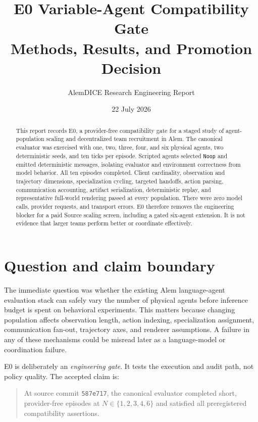 \documentclass[11pt]{article}
\title{E0 Variable-Agent Compatibility Gate\\
\large Methods, Results, and Promotion Decision}
\author{AlemDICE Research Engineering Report}
\date{22 July 2026}
\newcommand{\code}[1]{\texttt{#1}}
\begin{document}
\maketitle

\begin{abstract}
This report records E0, a provider-free compatibility gate for a staged study of
agent-population scaling and decentralized team recruitment in Alem.  The
canonical evaluator was exercised with one, two, three, four, and six physical
agents, two deterministic seeds, and ten ticks per episode.  Scripted agents
selected \code{Noop} and emitted deterministic messages, isolating evaluator and
environment correctness from model behavior.  All ten episodes completed.
Client cardinality, observation and trajectory dimensions, specialization
cycling, targeted handoffs, action parsing, communication accounting, artifact
serialization, deterministic replay, and representative full-world rendering
passed at every population.  There were zero model calls, provider requests, and
transport errors.  E0 therefore removes the engineering blocker for a paid
Source scaling screen, including a gated six-agent extension.  It is not evidence
that larger teams perform better or coordinate effectively.
\end{abstract}

\section{Question and claim boundary}

The immediate question was whether the existing Alem language-agent evaluation
stack can safely vary the number of physical agents before inference budget is
spent on behavioral experiments.  This matters because changing population
affects observation length, action indexing, specialization assignment,
communication fan-out, trajectory axes, and renderer assumptions.  A failure in
any of these mechanisms could be misread later as a language-model or
coordination failure.

E0 is deliberately an \emph{engineering gate}.  It tests the execution and audit
path, not policy quality.  The accepted claim is:

\begin{quote}
At source commit \code{587e717}, the canonical evaluator completed short,
provider-free episodes at $N\in\{1,2,3,4,6\}$ and satisfied all preregistered
compatibility assertions.
\end{quote}
\end{document}
